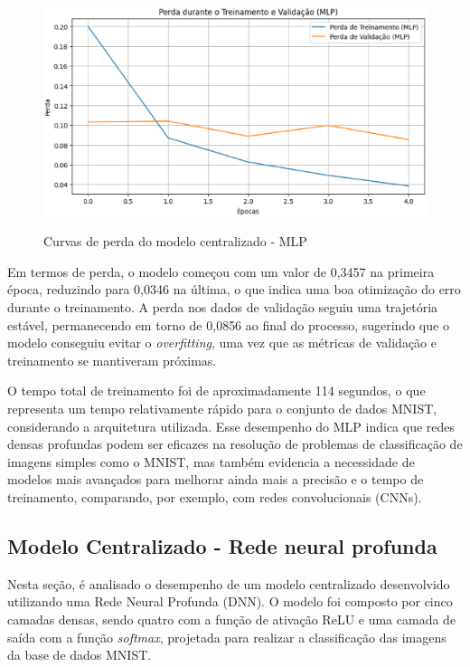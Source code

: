 \begin{figure}[ht]
    \centering
    \caption{Curvas de perda do modelo centralizado - MLP}
    \includegraphics[scale=0.4]{figuras/analiseResultados/lossMLP.eps}
    \label{fig:lossMLP}
\end{figure}

Em termos de perda, o modelo começou com um valor de 0,3457 na primeira época, reduzindo para 0,0346 na última, o que indica uma boa otimização do erro durante o treinamento. A perda nos dados de validação seguiu uma trajetória estável, permanecendo em torno de 0,0856 ao final do processo, sugerindo que o modelo conseguiu evitar o \textit{overfitting}, uma vez que as métricas de validação e treinamento se mantiveram próximas.

O tempo total de treinamento foi de aproximadamente 114 segundos, o que representa um tempo relativamente rápido para o conjunto de dados MNIST, considerando a arquitetura utilizada. Esse desempenho do MLP indica que redes densas profundas podem ser eficazes na resolução de problemas de classificação de imagens simples como o MNIST, mas também evidencia a necessidade de modelos mais avançados para melhorar ainda mais a precisão e o tempo de treinamento, comparando, por exemplo, com redes convolucionais (CNNs).

\subsection{Modelo Centralizado - Rede neural profunda}

Nesta seção, é analisado o desempenho de um modelo centralizado desenvolvido utilizando uma Rede Neural Profunda (DNN). O modelo foi composto por cinco camadas densas, sendo quatro com a função de ativação ReLU e uma camada de saída com a função \textit{softmax}, projetada para realizar a classificação das imagens da base de dados MNIST.

